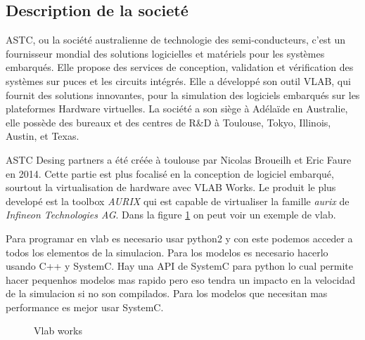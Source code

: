 \subsection{Description de la societ\'e}
ASTC, ou la société australienne de technologie des semi-conducteurs, c’est un fournisseur mondial des solutions logicielles et matériels pour les systèmes embarqués. Elle propose des services de conception, validation et vérification des systèmes sur puces et les circuits intégrés. Elle a développé son outil VLAB, qui fournit des solutions innovantes, pour la simulation des logiciels embarqués sur les plateformes Hardware virtuelles. La société a son siège à Adélaïde en Australie, elle possède des bureaux et des centres de R&D à Toulouse, Tokyo, Illinois, Austin, et Texas. 

ASTC Desing partners a été créée \`a toulouse par Nicolas Broueilh et Eric Faure en 2014. Cette partie est plus focalis\'e en la conception de logiciel embarqu\'e, sourtout la virtualisation de hardware avec VLAB Works. Le produit le plus develop\'e est la toolbox \textit{AURIX} qui est capable de virtualiser la famille \textit{aurix} de \textit{Infineon Technologies AG}. Dans la figure \ref{fig:vlab-presentation} on peut voir un exemple de vlab.

Para programar en vlab es necesario usar python2 y con este podemos acceder a todos los elementos de la simulacion. Para los modelos es necesario hacerlo usando C++ y SystemC. Hay una API de SystemC para python lo cual permite hacer pequenhos modelos mas rapido pero eso tendra un impacto en la velocidad de la simulacion si no son compilados. Para los modelos que necesitan mas performance es mejor usar SystemC.



\begin{figure}[!htb]
    \centering
    \caption{Vlab works}
    \label{fig:vlab-presentation}
\end{figure}

